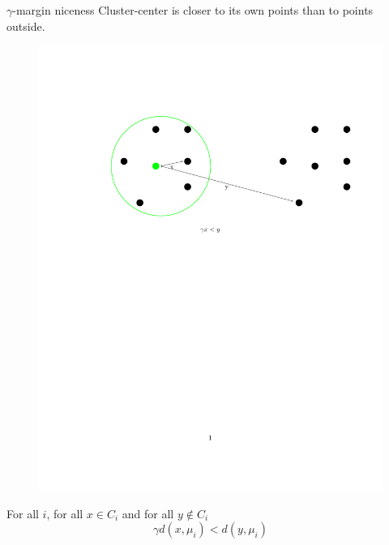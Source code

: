 \documentclass{beamer}
\begin{document}
\begin{frame}{$\gamma$-margin niceness}
	Cluster-center is closer to its own points than to points outside.
	\vspace{1cm}\begin{figure}        
            \centering\includegraphics[trim= 400 470 400 150, scale=0.5]{figures/gammaMargin.pdf}
    \end{figure} 
    \begin{block}{}
		For all $i$, for all $x \in C_i$ and for all $y \not\in C_i$
		$$\gamma d(x, \mu_i) < d(y, \mu_i)$$	
	\end{block}  
\end{frame}
\end{document}
